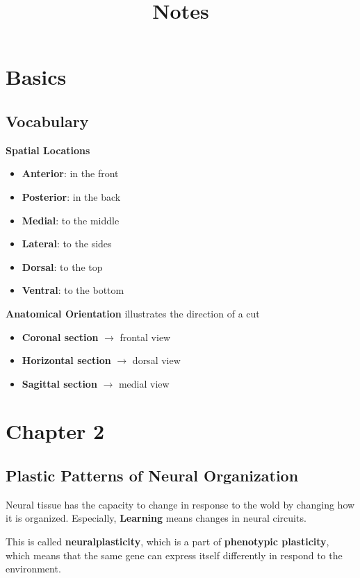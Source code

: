 \documentclass{article}
\title{Notes}
\begin{document}
\maketitle
\section{Basics}

\subsection{Vocabulary}

\textbf{Spatial Locations}
\begin{itemize}
\item {
    \textbf{Anterior}: in the front
}\item {
    \textbf{Posterior}: in the back
}\item {
    \textbf{Medial}: to the middle
}\item {
    \textbf{Lateral}: to the sides
}\item {
    \textbf{Dorsal}: to the top
}\item {
    \textbf{Ventral}: to the bottom
}
\end{itemize}

\noindent
\textbf{Anatomical Orientation}
illustrates the direction of a cut
\begin{itemize}
\item {
    \textbf{Coronal section} \(\rightarrow\) frontal view
}\item {
    \textbf{Horizontal section} \(\rightarrow\) dorsal view
}\item {
    \textbf{Sagittal section} \(\rightarrow\) medial view
}
\end{itemize}





\section{Chapter 2}
\subsection{Plastic Patterns of Neural Organization}
Neural tissue has the capacity to change in response to the wold by changing how it is organized. Especially, \textbf{Learning} means changes in neural circuits.

This is called \textbf{neuralplasticity}, which is a part of \textbf{phenotypic plasticity}, which means that the same gene can express itself differently in respond to the environment.
\end{document}
